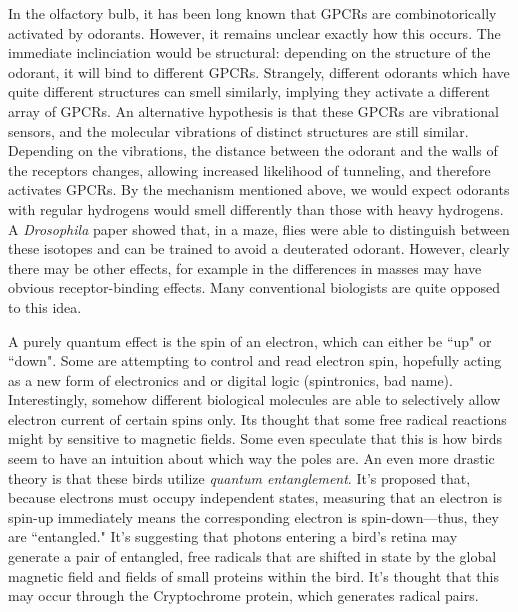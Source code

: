     In the olfactory bulb, it has been long known that GPCRs are combinotorically activated by odorants. However, it remains unclear exactly how this occurs. The immediate inclinciation would be structural: depending on the structure of the odorant, it will bind to different GPCRs. Strangely, different odorants which have quite different structures can smell similarly, implying they activate a different array of GPCRs. An alternative hypothesis is that these GPCRs are vibrational sensors, and the molecular vibrations of distinct structures are still similar. Depending on the vibrations, the distance between the odorant and the walls of the receptors changes, allowing increased likelihood of tunneling, and therefore activates GPCRs. By the mechanism mentioned above, we would expect odorants with regular hydrogens would smell differently than those with heavy hydrogens. A \textit{Drosophila} paper showed that, in a maze, flies were able to distinguish between these isotopes and can be trained to avoid a deuterated odorant. However, clearly there may be other effects, for example in the differences in masses may have obvious receptor-binding effects. Many conventional biologists are quite opposed to this idea.\newline

    A purely quantum effect is the spin of an electron, which can either be ``up" or ``down". Some are attempting to control and read electron spin, hopefully acting as a new form of electronics and or digital logic (spintronics, bad name). Interestingly, somehow different biological molecules are able to selectively allow electron current of certain spins only. Its thought that some free radical reactions might by sensitive to magnetic fields. Some even speculate that this is how birds seem to have an intuition about which way the poles are. An even more drastic theory is that these birds utilize \textit{quantum entanglement}. It's proposed that, because electrons must occupy independent states, measuring that an electron is spin-up immediately means the corresponding electron is spin-down---thus, they are ``entangled."  It's suggesting that photons entering a bird's retina may generate a pair of entangled, free radicals that are shifted in state by the global magnetic field and fields of small proteins within the bird. It's thought that this may occur through the Cryptochrome protein, which generates radical pairs.\newline

